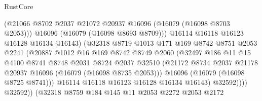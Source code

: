 \begin{lexlean}{RustCore}
\begin{coremodule}
                                (@21066
                                  @8702
                                  @2037
                                  @21072
                                  @20937
                                  @16096
                                  (@16079 (@16098 @8703 @2053)))
                                @16096
                                (@16079 (@16098 @8693 @8709)))
                              @16114
                              @16118
                              @16123
                              @16128
                              @16134
                              @16143)
                            (@32318
                              @8719
                              @1013
                              @171
                              @169
                              @8742
                              @8751
                              @2053
                              @2241
                              (@20887
                                @1012
                                @16
                                @169
                                @8742
                                @8749
                                @2060
                                (@32497
                                  @186
                                  @11
                                  @15
                                  @4100
                                  @8741
                                  @8748
                                  @2031
                                  @8724
                                  @2037
                                  @32510
                                  (@21172
                                    @8734
                                    @2037
                                    @21178
                                    @20937
                                    @16096
                                    (@16079 (@16098 @8735 @2053)))
                                  @16096
                                  (@16079 (@16098 @8725 @8741)))
                                @16114
                                @16118
                                @16123
                                @16128
                                @16134
                                @16143)
                              @32592))))
                      @32592))
                  (@32318
                    @8759
                    @184
                    @145
                    @11
                    @2053
                    @2272
                    @2053
                    @2172

\end{coremodule}
\end{lexlean}
